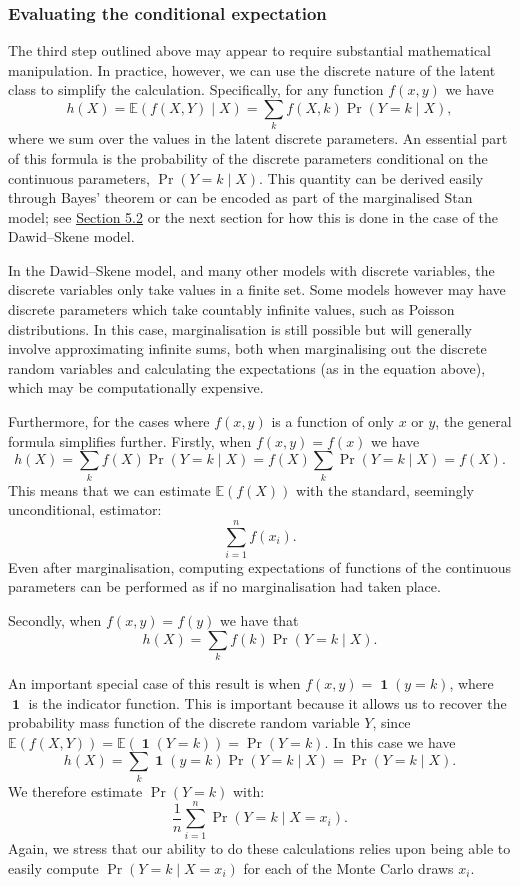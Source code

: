 \hypertarget{evaluating-the-conditional-expectation}{%
\subsubsection{Evaluating the conditional expectation}\label{evaluating-the-conditional-expectation}}

The third step outlined above may appear to require substantial
mathematical manipulation. In practice, however, we can use the discrete
nature of the latent class to simplify the calculation. Specifically,
for any function \(f(x, y)\) we have
\[
h(X)
    = \mathbb{E}(f(X, Y) \mid X)
    = \sum_{k} f(X, k) \Pr(Y = k \mid X),
\]
where we sum over the values in the latent discrete parameters. An
essential part of this formula is the probability of the discrete
parameters conditional on the continuous parameters,
\(\Pr(Y = k \mid X)\). This quantity can be derived easily through Bayes'
theorem or can be encoded as part of the marginalised Stan model; see
\protect\hyperlink{sec:conditioning}{Section 5.2} or the next section for how this is done in the
case of the Dawid--Skene model.

In the Dawid--Skene model, and many other models with discrete
variables, the discrete variables only take values in a finite set. Some
models however may have discrete parameters which take countably
infinite values, such as Poisson distributions. In this case,
marginalisation is still possible but will generally involve
approximating infinite sums, both when marginalising out the discrete
random variables and calculating the expectations (as in the equation
above), which may be computationally expensive.

Furthermore, for the cases where \(f(x, y)\) is a function of only \(x\) or
\(y\), the general formula simplifies further. Firstly, when
\(f(x, y) = f(x)\) we have
\[
h(X)
    = \sum_{k} f(X) \Pr(Y = k \mid X)
    = f(X) \sum_{k} \Pr(Y = k \mid X)
    = f(X).
\]
This means that we can estimate \(\mathbb{E}(f(X))\) with the standard,
seemingly unconditional, estimator:
\[
\sum_{i = 1}^n f(x_i).
\]
Even after marginalisation, computing expectations of functions of the
continuous parameters can be performed as if no marginalisation had
taken place.

Secondly, when \(f(x, y) = f(y)\) we have that
\[
h(X) = \sum_{k} f(k) \Pr(Y = k \mid X).
\]

An important special case of this result is when
\(f(x, y) = \mathop{\mathrm{\mathbf{1}}}(y = k)\), where
\(\mathop{\mathrm{\mathbf{1}}}\) is the indicator function. This is
important because it allows us to recover the probability mass function
of the discrete random variable \(Y\), since
\(\mathbb{E}(f(X, Y)) = \mathbb{E}(\mathop{\mathrm{\mathbf{1}}}(Y = k)) = \Pr(Y = k)\).
In this case we have
\[
h(X)
    = \sum_{k} \mathop{\mathrm{\mathbf{1}}}(y = k) \Pr(Y = k \mid X)
    = \Pr(Y = k \mid X).
\]
We therefore estimate \(\Pr(Y = k)\) with:
\[
\frac{1}{n} \sum_{i = 1}^n
    \Pr(Y = k \mid X = x_i).
\]
Again, we stress that our ability to do these calculations relies upon
being able to easily compute \(\Pr(Y = k \mid X = x_i)\) for each of the
Monte Carlo draws \(x_i\).

